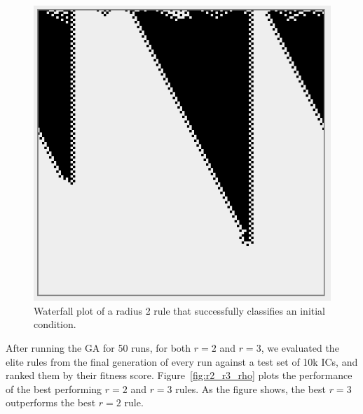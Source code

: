 \begin{figure} [H]
\begin{center}
\includegraphics[width=0.8\linewidth]{figures/converging_radius2.png}
\caption{Waterfall plot of a radius 2 rule that successfully classifies an initial condition.}
\label{fig:waterfall_2}
\end{center}
\end{figure}

After running the GA for 50 runs, for both $r = 2$ and $r = 3$, we evaluated the elite rules from the final generation of every run against a test set of 10k ICs, and ranked them by their fitness score. Figure~\ref{fig:r2_r3_rho} plots the performance of the best performing $r = 2$ and $r = 3$ rules. As the figure shows, 
the best $r = 3$ outperforms the best $r = 2$ rule.

